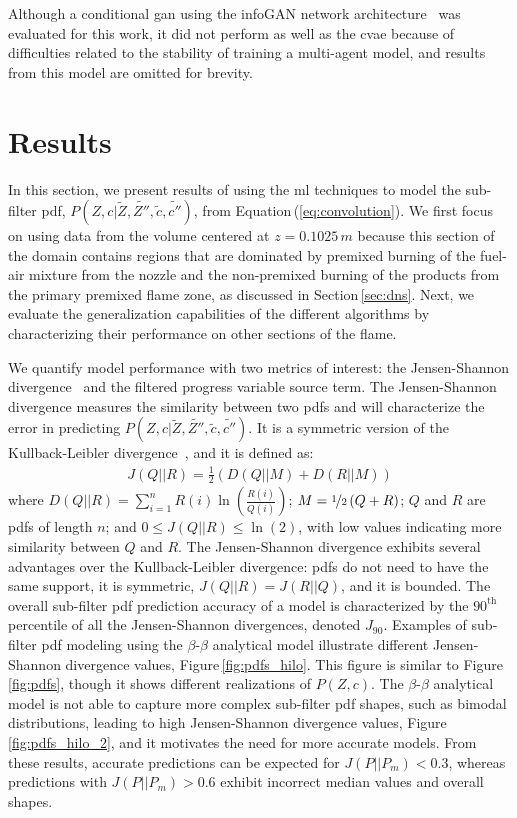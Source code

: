 \documentclass[review]{elsarticle}
\newcommand{\wt}[1]{\widetilde{#1}}
\begin{document}
Although a conditional \gls{gan} using the infoGAN network
architecture~\cite{Chen2016a} was evaluated for this work, it did not
perform as well as the \gls{cvae} because of difficulties related to the
stability of training a multi-agent model, and results from this model
are omitted for brevity.

\section{Results}\label{sec:results}

In this section, we present results of using the \gls{ml}
techniques to model the sub-filter \gls{pdf},
$P(Z,c | \wt{Z}, \wt{Z''}, \wt{c}, \wt{c''})$, from
Equation\,(\ref{eq:convolution}). We first focus on using data from
the volume centered at $z=0.1025\,\unit{m}$ because this section of the
domain contains regions that are dominated by premixed burning of the
fuel-air mixture from the nozzle and the non-premixed burning of the
products from the primary premixed flame zone, as discussed in
Section\,\ref{sec:dns}. Next, we evaluate the generalization
capabilities of the different algorithms by characterizing their
performance on other sections of the flame.

We quantify model performance with two metrics of interest: the
Jensen-Shannon divergence~\cite{Endres2003, Osterreicher2003} and the
filtered progress variable source term. The Jensen-Shannon divergence
measures the similarity between two \glspl{pdf} and will characterize
the error in predicting $P(Z,c | \wt{Z}, \wt{Z''}, \wt{c},
\wt{c''})$. It is a symmetric version of the Kullback-Leibler
divergence~\cite{Kullback1987}, and it is defined as:
\begin{align}
  \label{eq:jsd}
  J(Q||R) = \frac{1}{2} \left( D(Q || M) + D(R || M)\right)
\end{align}
where
$D(Q||R) = \sum_{i=1}^n R(i) \ln{\left( \frac{R(i)}{Q(i)} \right)}$;
$M = \nicefrac{1}{2} \left( Q+R \right)$; $Q$ and $R$ are \glspl{pdf}
of length $n$; and $0\leq J(Q||R) \leq \ln{(2)}$, with low values
indicating more similarity between $Q$ and $R$. The Jensen-Shannon
divergence exhibits several advantages over the Kullback-Leibler
divergence: \glspl{pdf} do not need to have the same support, it is
symmetric, $J(Q||R) = J(R||Q)$, and it is bounded. The overall
sub-filter \gls{pdf} prediction accuracy of a model is characterized
by the $90^{\text{th}}$ percentile of all the Jensen-Shannon
divergences, denoted $J_{90}$. Examples of sub-filter \gls{pdf}
modeling using the $\beta$-$\beta$ analytical model illustrate
different Jensen-Shannon divergence values,
Figure\,\ref{fig:pdfs_hilo}. This figure is similar to
Figure\,\ref{fig:pdfs}, though it shows different realizations of
$P(Z,c)$. The $\beta$-$\beta$ analytical model is not able to capture
more complex sub-filter \gls{pdf} shapes, such as bimodal
distributions, leading to high Jensen-Shannon divergence values,
Figure\,\ref{fig:pdfs_hilo_2}, and it motivates the need for more
accurate models.  From these results, accurate predictions can be
expected for $J(P||P_m) < 0.3$, whereas predictions with
$J(P||P_m) > 0.6$ exhibit incorrect median values and overall shapes.
\end{document}
